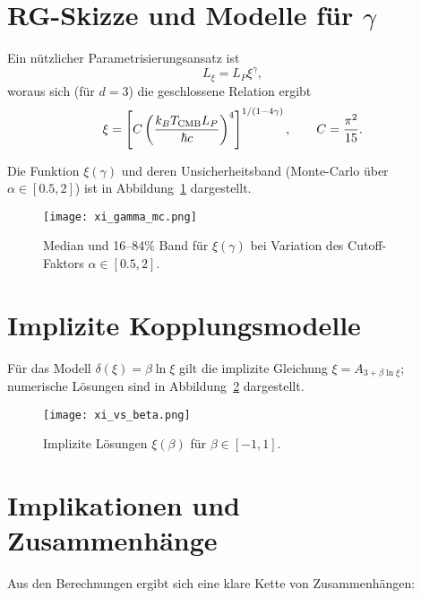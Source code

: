 \documentclass[12pt,a4paper]{article}
\begin{document}
	\section{RG-Skizze und Modelle für $\gamma$}
	Ein nützlicher Parametrisierungsansatz ist
	\begin{equation}
		L_\xi = L_P\xi^{\gamma},
	\end{equation}
	woraus sich (für $d=3$) die geschlossene Relation ergibt
	\begin{equation}
		\xi = \left[ C \left(\frac{k_B T_{\rm CMB} L_P}{\hbar c}\right)^4 \right]^{1/(1-4\gamma)},\qquad C=\frac{\pi^2}{15}.
	\end{equation}
	
	Die Funktion $\xi(\gamma)$ und deren Unsicherheitsband (Monte-Carlo über $\alpha\in[0.5,2]$) ist in Abbildung~\ref{fig:xi_gamma_mc} dargestellt.
	
	\begin{figure}[htbp]
		\centering
		\texttt{[image: xi\_gamma\_mc.png]}
		\caption{Median und 16--84\% Band für $\xi(\gamma)$ bei Variation des Cutoff-Faktors $\alpha\in[0.5,2]$.}
		\label{fig:xi_gamma_mc}
	\end{figure}
	
	\section{Implizite Kopplungsmodelle}
	Für das Modell $\delta(\xi)=\beta\ln\xi$ gilt die implizite Gleichung $\xi=A_{3+\beta\ln\xi}$; numerische Lösungen sind in Abbildung~\ref{fig:xi_vs_beta} dargestellt.
	
	\begin{figure}[htbp]
		\centering
		\texttt{[image: xi\_vs\_beta.png]}
		\caption{Implizite Lösungen $\xi(\beta)$ für $\beta\in[-1,1]$.}
		\label{fig:xi_vs_beta}
	\end{figure}
	
	\section{Implikationen und Zusammenhänge}
	\label{sec:discussion}
	
	Aus den Berechnungen ergibt sich eine klare Kette von Zusammenhängen:
	
\end{document}
